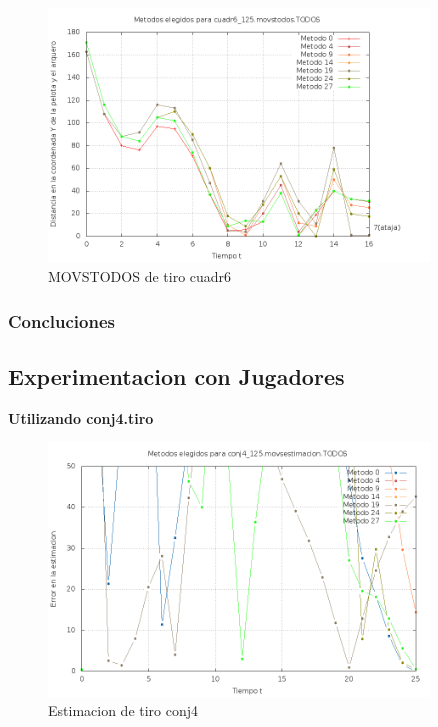 \begin{figure}[H]
\begin{center}
\includegraphics[width=0.9\textwidth]{img/cuadr6_125_movstodos_TODOS_elegidos.png}
     \caption{MOVSTODOS de tiro cuadr6}
\end{center}     
\end{figure}

\subsubsection{Concluciones}

\subsection{Experimentacion con Jugadores}


\textbf{Utilizando conj4.tiro}

\begin{figure}[H]
\begin{center}
\includegraphics[width=0.9\textwidth]{img/conj4_125_movsestimacion_TODOS_elegidos.png}
     \caption{Estimacion de tiro conj4}
\end{center}
\end{figure}

